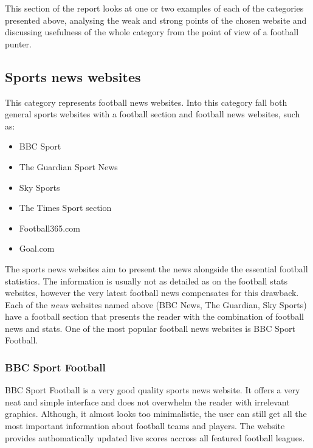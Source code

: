 This section of the report looks at one or two examples of each of the categories presented above, analysing the weak and strong points of the chosen website and discussing usefulness of the whole category from the point of view of a football punter.
	
\subsection{Sports news websites}
\label{subsec:sportsnewswebsites_req}
This category represents football news websites. Into this category fall both general sports websites with a football section and football news websites, such as:
	
\begin{itemize}
	 \item BBC Sport \citep{source:bbcsport}
	 \item The Guardian Sport News \citep{source:guardiansport}
	 \item Sky Sports \citep{source:skysports}
	 \item The Times Sport section \citep{source:thetimes}
	 \item Football365.com \citep{source:football365}
	 \item Goal.com \citep{source:goal}
\end{itemize}

The sports news websites aim to present the news alongside the essential football statistics. The information is usually not as detailed as on the football stats websites, however the very latest football news compensates for this drawback. Each of the \emph{news} websites named above (BBC News, The Guardian, Sky Sports) have a football section that presents the reader with the combination of football news and stats.  One of the most popular football news websites is BBC Sport Football.
	
\subsubsection{BBC Sport Football}
\label{subsubsec:bbcsportfootball_req}
BBC Sport Football is a very good quality sports news website. It offers a very neat and simple interface and does not overwhelm the reader with irrelevant graphics. Although, it almost looks too minimalistic, the user can still get all the most important information about football teams and players. The website provides authomatically updated live scores accross all featured football leagues.

